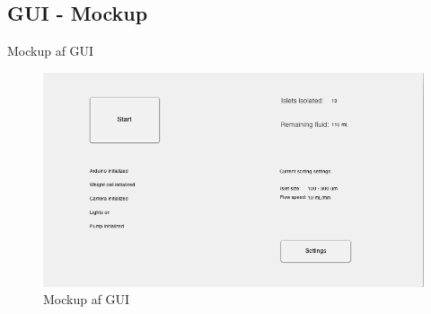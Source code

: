 \subsection{GUI - Mockup}
Mockup af GUI
\begin{figure}[H]
	\centering
	\includegraphics[width=1\textwidth]{billeder/GUI.png}
	\caption{Mockup af GUI}
	\label{fig:moscow}
\end{figure}